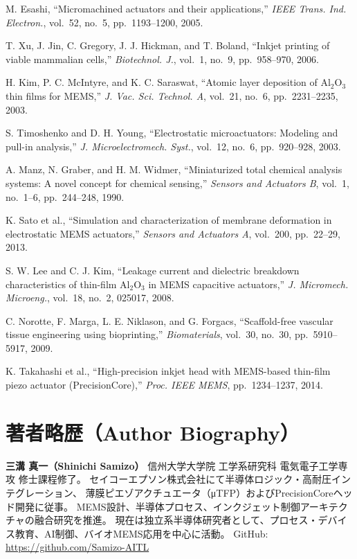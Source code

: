 \documentclass[conference]{IEEEtran}
\begin{document}
\balance

\begin{thebibliography}{99}

M. Esashi, ``Micromachined actuators and their applications,'' 
\emph{IEEE Trans. Ind. Electron.}, vol.~52, no.~5, pp.~1193–1200, 2005.

T. Xu, J. Jin, C. Gregory, J. J. Hickman, and T. Boland, 
``Inkjet printing of viable mammalian cells,'' 
\emph{Biotechnol. J.}, vol.~1, no.~9, pp.~958–970, 2006.

H. Kim, P. C. McIntyre, and K. C. Saraswat, 
``Atomic layer deposition of Al$_2$O$_3$ thin films for MEMS,'' 
\emph{J. Vac. Sci. Technol. A}, vol.~21, no.~6, pp.~2231–2235, 2003.

S. Timoshenko and D. H. Young, 
``Electrostatic microactuators: Modeling and pull-in analysis,'' 
\emph{J. Microelectromech. Syst.}, vol.~12, no.~6, pp.~920–928, 2003.

A. Manz, N. Graber, and H. M. Widmer, 
``Miniaturized total chemical analysis systems: A novel concept for chemical sensing,'' 
\emph{Sensors and Actuators B}, vol.~1, no.~1–6, pp.~244–248, 1990.

K. Sato et al., 
``Simulation and characterization of membrane deformation in electrostatic MEMS actuators,'' 
\emph{Sensors and Actuators A}, vol.~200, pp.~22–29, 2013.

S. W. Lee and C. J. Kim, 
``Leakage current and dielectric breakdown characteristics of thin-film Al$_2$O$_3$ in MEMS capacitive actuators,'' 
\emph{J. Micromech. Microeng.}, vol.~18, no.~2, 025017, 2008.

C. Norotte, F. Marga, L. E. Niklason, and G. Forgacs, 
``Scaffold-free vascular tissue engineering using bioprinting,'' 
\emph{Biomaterials}, vol.~30, no.~30, pp.~5910–5917, 2009.

K. Takahashi et al., 
``High-precision inkjet head with MEMS-based thin-film piezo actuator (PrecisionCore),'' 
\emph{Proc. IEEE MEMS}, pp.~1234–1237, 2014.

\end{thebibliography}

\section*{著者略歴（Author Biography）}
\textbf{三溝 真一（Shinichi Samizo）} 信州大学大学院 工学系研究科 電気電子工学専攻 修士課程修了。  
セイコーエプソン株式会社にて半導体ロジック・高耐圧インテグレーション、
薄膜ピエゾアクチュエータ（μTFP）およびPrecisionCoreヘッド開発に従事。  
MEMS設計、半導体プロセス、インクジェット制御アーキテクチャの融合研究を推進。  
現在は独立系半導体研究者として、プロセス・デバイス教育、AI制御、バイオMEMS応用を中心に活動。  
GitHub: \url{https://github.com/Samizo-AITL}
\end{document}
